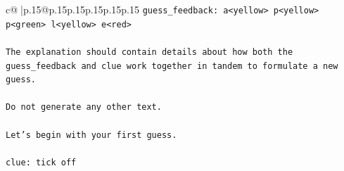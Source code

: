 \documentclass{article}
\begin{document}
{\begin{supertabular}{c@{$\;$}|p{.15\linewidth}@{}p{.15\linewidth}p{.15\linewidth}p{.15\linewidth}p{.15\linewidth}p{.15\linewidth}}
{{{\texttt{guess\_feedback: a<yellow> p<yellow> p<green> l<yellow> e<red>} \\
\\ 
\texttt{The explanation should contain details about how both the guess\_feedback and clue work together in tandem to formulate a new guess.} \\
\\ 
\texttt{Do not generate any other text.} \\
\\ 
\texttt{Let's begin with your first guess.} \\
\\ 
\texttt{clue: tick off} \\
            }
        }
    }
     \\ \\


\end{supertabular}}
\end{document}
